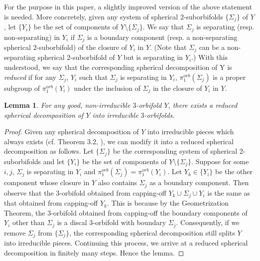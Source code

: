 \documentclass[11pt]{amsart}
\theoremstyle{plain}
\numberwithin{theorem}{section}
\newtheorem{lemma}[theorem]{Lemma}
\theoremstyle{definition}
\begin{document}
For the purpose in this paper, a slightly improved version of the above statement 
is needed. More concretely, given any system of spherical $2$-suborbifolds 
$\{\Sigma_j\}$ of $Y$, let $\{Y_i\}$ be the set of components of $Y\setminus \{\Sigma_j\}$. 
We say that $\Sigma_j$ is separating (resp. non-separating) in $Y_i$ if $\Sigma_j$ is a boundary 
component (resp. a non-separating spherical $2$-suborbifold) of the closure of $Y_i$ in $Y$. 
(Note that $\Sigma_j$ can be a non-separating spherical $2$-suborbifold of $Y$ but is 
separating in $Y_i$.)
With this understood, we say that the corresponding spherical decomposition of Y is {\it reduced} 
if for any $\Sigma_j$, $Y_i$ such that $\Sigma_j$ is separating in $Y_i$, $\pi_1^{orb}(\Sigma_j)$ 
is a proper subgroup of $\pi_1^{orb}(Y_i)$ under the inclusion of $\Sigma_j$ in the closure of 
$Y_i$ in $Y$. 

\begin{lemma}
For any good, non-irreducible $3$-orbifold $Y$, there exists a reduced spherical 
decomposition of $Y$ into irreducible $3$-orbifolds. 
\end{lemma}

\begin{proof}
Given any spherical decomposition of $Y$ into irreducible pieces which always 
exists (cf. Theorem 3.2, \cite{BMP}), we can modify it into a reduced spherical decomposition 
as follows. Let $\{\Sigma_j\}$ be the corresponding system of spherical 2-suborbifolds and 
let $\{Y_i\}$ be the set of components of $Y\setminus \{\Sigma_j\}$. Suppose for some $i,j$, 
$\Sigma_j$ is separating in $Y_i$ and $\pi_1^{orb}(\Sigma_j)=\pi_1^{orb}(Y_i)$. Let $Y_k\in\{Y_i\}$ 
be the other component whose closure in $Y$ also contains $\Sigma_j$ as a boundary component. 
Then observe that the $3$-orbifold obtained from capping-off $Y_k\cup\Sigma_j\cup Y_i$ is the same 
as that obtained from capping-off $Y_k$. This is because by the Geometrization Theorem, 
the $3$-orbifold obtained from capping-off the boundary components of $Y_i$ other than $\Sigma_j$ 
is a discal $3$-orbifold with boundary $\Sigma_j$. Consequently, if we remove $\Sigma_j$ from 
$\{\Sigma_j\}$, the corresponding spherical decomposition still splits $Y$ into irreducible pieces. 
Continuing this process, we arrive at a reduced spherical decomposition in finitely many steps. 
Hence the lemma. 

\end{proof}
\end{document}
